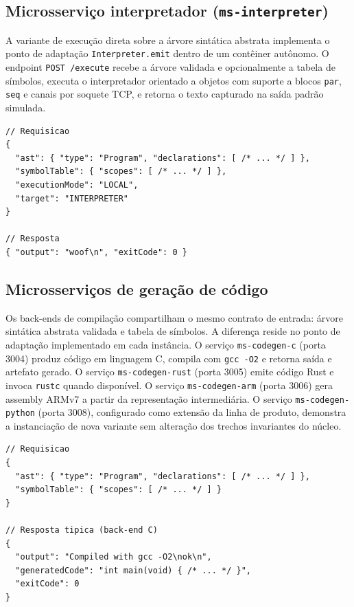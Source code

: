 \subsection{Microsserviço interpretador (\texttt{ms-interpreter})}

A variante de execução direta sobre a árvore sintática abstrata implementa o ponto de adaptação \texttt{Interpreter.emit} dentro de um contêiner autônomo. O endpoint \texttt{POST /execute} recebe a árvore validada e opcionalmente a tabela de símbolos, executa o interpretador orientado a objetos com suporte a blocos \texttt{par}, \texttt{seq} e canais por soquete TCP, e retorna o texto capturado na saída padrão simulada.

\begin{lstlisting}[caption={Contrato de \texttt{POST /execute} (porta 3003)}]
// Requisicao
{
  "ast": { "type": "Program", "declarations": [ /* ... */ ] },
  "symbolTable": { "scopes": [ /* ... */ ] },
  "executionMode": "LOCAL",
  "target": "INTERPRETER"
}

// Resposta
{ "output": "woof\n", "exitCode": 0 }
\end{lstlisting}

\subsection{Microsserviços de geração de código}

Os back-ends de compilação compartilham o mesmo contrato de entrada: árvore sintática abstrata validada e tabela de símbolos. A diferença reside no ponto de adaptação implementado em cada instância. O serviço \texttt{ms-codegen-c} (porta 3004) produz código em linguagem C, compila com \texttt{gcc -O2} e retorna saída e artefato gerado. O serviço \texttt{ms-codegen-rust} (porta 3005) emite código Rust e invoca \texttt{rustc} quando disponível. O serviço \texttt{ms-codegen-arm} (porta 3006) gera assembly ARMv7 a partir da representação intermediária. O serviço \texttt{ms-codegen-python} (porta 3008), configurado como extensão da linha de produto, demonstra a instanciação de nova variante sem alteração dos trechos invariantes do núcleo.

\begin{lstlisting}[caption={Contrato comum \texttt{POST /generate}}]
// Requisicao
{
  "ast": { "type": "Program", "declarations": [ /* ... */ ] },
  "symbolTable": { "scopes": [ /* ... */ ] }
}

// Resposta tipica (back-end C)
{
  "output": "Compiled with gcc -O2\nok\n",
  "generatedCode": "int main(void) { /* ... */ }",
  "exitCode": 0
}
\end{lstlisting}

